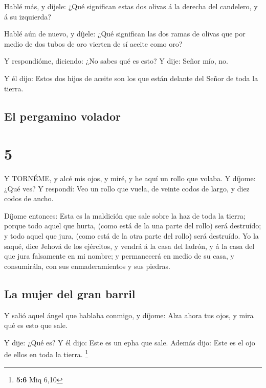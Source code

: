  Hablé más, y díjele: ¿Qué significan estas dos olivas á la
derecha del candelero, y á su izquierda?

 Hablé aún de nuevo, y díjele: ¿Qué significan las dos
ramas de olivas que por medio de dos tubos de oro vierten de sí aceite
como oro?

 Y respondióme, diciendo: ¿No sabes qué es esto? Y dije:
Señor mío, no.

 Y él dijo: Estos dos hijos de aceite son los que están
delante del Señor de toda la tierra.

\hypertarget{el-pergamino-volador}{%
\subsection{El pergamino volador}\label{el-pergamino-volador}}

\hypertarget{section-4}{%
\section{5}\label{section-4}}

 Y TORNÉME, y alcé mis ojos, y miré, y he aquí un rollo que
volaba.  Y díjome: ¿Qué ves? Y respondí: Veo un rollo que
vuela, de veinte codos de largo, y diez codos de ancho.

 Díjome entonces: Esta es la maldición que sale sobre la haz
de toda la tierra; porque todo aquel que hurta, (como está de la una
parte del rollo) será destruído; y todo aquel que jura, (como está de la
otra parte del rollo) será destruído.  Yo la saqué, dice
Jehová de los ejércitos, y vendrá á la casa del ladrón, y á la casa del
que jura falsamente en mi nombre; y permanecerá en medio de su casa, y
consumirála, con sus enmaderamientos y sus piedras.

\hypertarget{la-mujer-del-gran-barril}{%
\subsection{La mujer del gran barril}\label{la-mujer-del-gran-barril}}

 Y salió aquel ángel que hablaba conmigo, y díjome: Alza
ahora tus ojos, y mira qué es esto que sale.

 Y dije: ¿Qué es? Y él dijo: Este es un epha que sale.
Además dijo: Este es el ojo de ellos en toda la tierra. \footnote{\textbf{5:6}
  Miq 6,10}

